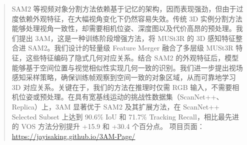 \begin{abstract}
SAM2 等视频对象分割方法依赖基于记忆的架构，因而表现强劲，但由于过度依赖外观特征，在大幅视角变化下仍然容易失效。传统 3D 实例分割方法能够处理视角一致性，却需要相机位姿、深度图以及代价高昂的预处理。我们提出 3AM，这是一种训练阶段增强方法，将 MUSt3R 的 3D 感知特征整合进 SAM2。我们设计的轻量级 Feature Merger 融合了多层级 MUSt3R 特征，这些特征编码了隐式几何对应关系。结合 SAM2 的外观特征后，模型能够基于空间位置与视觉相似性实现几何一致的识别。我们进一步提出视场感知采样策略，确保训练帧观察到空间一致的对象区域，从而可靠地学习 3D 对应关系。关键在于，我们的方法在推理时仅需 RGB 输入，不需要相机位姿或预处理。在具有宽基线运动的挑战性数据集（ScanNet++、Replica）上，3AM 显著优于 SAM2 及其扩展方法，在 ScanNet++ Selected Subset 上达到 90.6\% IoU 和 71.7\% Tracking Recall，相比最先进的 VOS 方法分别提升 +15.9 和 +30.4 个百分点。
项目页面：\url{https://jayisaking.github.io/3AM-Page/}
\end{abstract}

